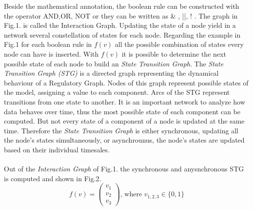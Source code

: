 Beside the mathematical annotation, the boolean rule can be constructed with the operator AND,OR, NOT or they can be written as \& , ||, ! . The graph in Fig.1. is called the Interaction Graph. Updating the state of a node yield in a network several constellation of states for each node. Regarding the example in Fig.1 for each boolean rule in $f(v)$ all the possible combination of states every node can have is inserted. With $f(v)$ it is possible to determine the next possible state of each node to build an \textit{State Transition Graph}. 
The \textit{State Transition Graph (STG)} is a directed graph representing the dynamical behaviour of a Regulatory Graph. Nodes of this graph represent possible states of the model, assigning a value to each component. Arcs of the STG represent transitions from one state to another. It is an important network to analyze how data behaves over time, thus the most possible state of each component can be computed. But not every state of a component of a node is updated at the same time. Therefore the \textit{State Transition Graph} is either synchronous, updating all the node's states simultaneously, or asynchrounus, the node's states are updated based on their individual timesales\citep{Lee799}. \\\\\newline
Out of the \textit{Interaction Graph} of Fig.1. the synchronous and anysnchronous STG is computed and shown in Fig.2.\\

\begin{equation}
f(v) =  \begin{pmatrix}
 v_1\\
 v_2\\
 v_3
\end{pmatrix}
\textrm{, where }v_{1,2,3}\in\lbrace 0,1\rbrace
\end{equation}

